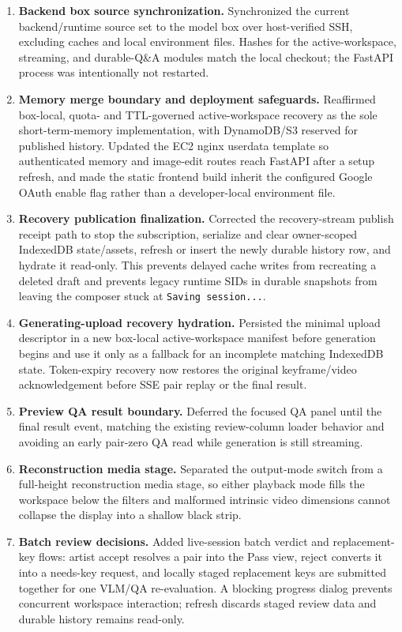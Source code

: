 \begin{enumerate}
  \item \textbf{Backend box source synchronization.} Synchronized the current backend/runtime source set to the model box over host-verified SSH, excluding caches and local environment files. Hashes for the active-workspace, streaming, and durable-Q\&A modules match the local checkout; the FastAPI process was intentionally not restarted.
  \item \textbf{Memory merge boundary and deployment safeguards.} Reaffirmed box-local, quota- and TTL-governed active-workspace recovery as the sole short-term-memory implementation, with DynamoDB/S3 reserved for published history. Updated the EC2 nginx userdata template so authenticated memory and image-edit routes reach FastAPI after a setup refresh, and made the static frontend build inherit the configured Google OAuth enable flag rather than a developer-local environment file.
  \item \textbf{Recovery publication finalization.} Corrected the recovery-stream publish receipt path to stop the subscription, serialize and clear owner-scoped IndexedDB state/assets, refresh or insert the newly durable history row, and hydrate it read-only. This prevents delayed cache writes from recreating a deleted draft and prevents legacy runtime SIDs in durable snapshots from leaving the composer stuck at \texttt{Saving session...}.
  \item \textbf{Generating-upload recovery hydration.} Persisted the minimal upload descriptor in a new box-local active-workspace manifest before generation begins and use it only as a fallback for an incomplete matching IndexedDB state. Token-expiry recovery now restores the original keyframe/video acknowledgement before SSE pair replay or the final result.
  \item \textbf{Preview QA result boundary.} Deferred the focused QA panel until the final result event, matching the existing review-column loader behavior and avoiding an early pair-zero QA read while generation is still streaming.
  \item \textbf{Reconstruction media stage.} Separated the output-mode switch from a full-height reconstruction media stage, so either playback mode fills the workspace below the filters and malformed intrinsic video dimensions cannot collapse the display into a shallow black strip.
  \item \textbf{Batch review decisions.} Added live-session batch verdict and replacement-key flows: artist accept resolves a pair into the Pass view, reject converts it into a needs-key request, and locally staged replacement keys are submitted together for one VLM/QA re-evaluation. A blocking progress dialog prevents concurrent workspace interaction; refresh discards staged review data and durable history remains read-only.

\end{enumerate}
